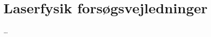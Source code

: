 \documentclass[crop=false, class=memoir]{standalone}
\begin{document}
\chapter{Laserfysik forsøgsvejledninger}

\ldots











\end{document}

